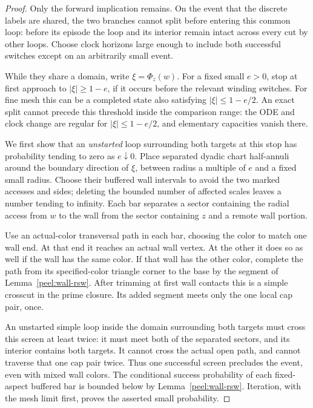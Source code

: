 \begin{proof}
Only the forward implication remains.  On the event that the discrete
labels are shared, the two branches cannot split before entering this
common loop: before its episode the loop and its interior remain
intact across every cut by other loops.  Choose clock horizons large
enough to include both successful switches except on an arbitrarily
small event.

While they share a domain, write $\xi=\Phi_z(w)$.  For a fixed small
$e>0$, stop at first approach to $|\xi|\ge1-e$, if it occurs before
the relevant winding switches.  For fine mesh this can be a completed
state also satisfying $|\xi|\le1-e/2$.  An exact split cannot precede
this threshold inside the comparison range: the ODE and clock change
are regular for $|\xi|\le1-e/2$, and elementary capacities vanish
there.

We first show that an \emph{unstarted} loop surrounding both targets
at this stop has probability tending to zero as $e\downarrow0$.
Place separated dyadic chart half-annuli around the boundary direction
of $\xi$, between radius a multiple of $e$ and a fixed small radius.
Choose their buffered wall intervals to avoid the two marked accesses
and sides; deleting the bounded number of affected scales leaves a
number tending to infinity.  Each bar separates a sector containing
the radial access from $w$ to the wall from the sector containing $z$
and a remote wall portion.

Use an actual-color transversal path in each bar, choosing the color
to match one wall end.  At that end it reaches an actual wall vertex.
At the other it does so as well if the wall has the same color.  If
that wall has the other color, complete the path from its specified-color
triangle corner to the base by the segment of
Lemma~\ref{peel:wall-rsw}.  After trimming at first wall contacts this
is a simple crosscut in the prime closure.  Its added segment meets
only the one local cap pair, once.

An unstarted simple loop inside the domain surrounding both targets
must cross this screen at least twice: it must meet both of the
separated sectors, and its interior contains both targets.  It cannot
cross the actual open path, and cannot traverse that one cap pair
twice.  Thus one successful screen precludes the event, even with
mixed wall colors.  The conditional success probability of each
fixed-aspect buffered bar is bounded below by
Lemma~\ref{peel:wall-rsw}.  Iteration, with the mesh limit first,
proves the asserted small probability.


\end{proof}
